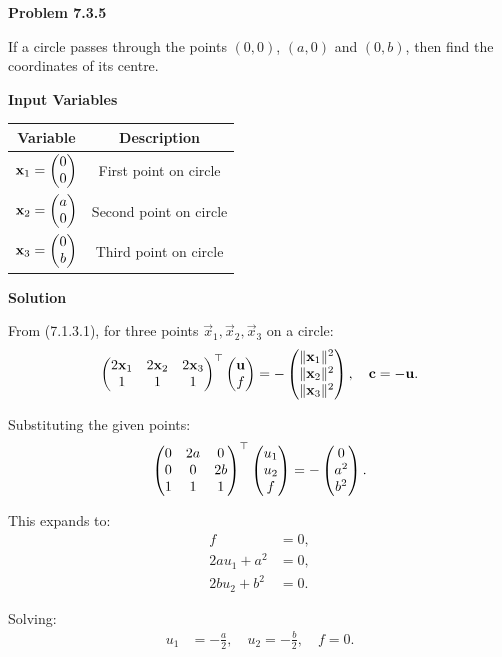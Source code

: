 \documentclass[12pt]{article}
\begin{document}
\textbf{Problem 7.3.5}

If a circle passes through the points $(0,0)$, $(a,0)$ and $(0,b)$, then find the coordinates of its centre.

\textbf{Input Variables}

\begin{table}[H]
\centering
\begin{tabular}{|c|c|}
\hline
Variable & Description \\
\hline
$\mathbf{x}_1 = \begin{pmatrix}0 \\ 0\end{pmatrix}$ & First point on circle \\
\hline
$\mathbf{x}_2 = \begin{pmatrix}a \\ 0\end{pmatrix}$ & Second point on circle \\
\hline
$\mathbf{x}_3 = \begin{pmatrix}0 \\ b\end{pmatrix}$ & Third point on circle \\
\hline
\end{tabular}
\end{table}

\textbf{Solution}

From (7.1.3.1), for three points $\vec{x}_1, \vec{x}_2, \vec{x}_3$ on a circle:
\begin{align}
\begin{pmatrix}
2\mathbf{x}_1 & 2\mathbf{x}_2 & 2\mathbf{x}_3 \\
1 & 1 & 1
\end{pmatrix}^\top
\begin{pmatrix}\mathbf{u} \\ f\end{pmatrix}
=
-\begin{pmatrix}\|\mathbf{x}_1\|^2 \\ \|\mathbf{x}_2\|^2 \\ \|\mathbf{x}_3\|^2\end{pmatrix},
\quad
\mathbf{c} = -\mathbf{u}.
\end{align}

Substituting the given points:
\begin{align}
\begin{pmatrix}
0 & 2a & 0 \\
0 & 0 & 2b \\
1 & 1 & 1
\end{pmatrix}^\top
\begin{pmatrix}u_1 \\ u_2 \\ f\end{pmatrix}
=
-\begin{pmatrix}0 \\ a^2 \\ b^2\end{pmatrix}.
\end{align}

This expands to:
\begin{align}
f &= 0, \\
2au_1 + a^2 &= 0, \\
2bu_2 + b^2 &= 0.
\end{align}

Solving:
\begin{align}
u_1 &= -\frac{a}{2}, \quad
u_2 = -\frac{b}{2}, \quad
f = 0.
\end{align}
\end{document}
